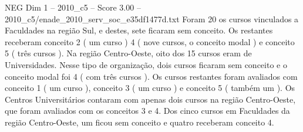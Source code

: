 \begin{textsample}{NEG Dim 1 – 2010\_c5 – Score 3.00 – 2010\_c5/enade\_2010\_serv\_soc\_e35df1477d.txt}
Foram 20 os cursos vinculados a Faculdades na região Sul, e destes, sete ficaram sem conceito.
Os restantes receberam conceito 2 ( um curso ) 4 ( nove cursos, o conceito modal ) e conceito 5 ( três cursos ).
Na região Centro-Oeste, oito dos 15 cursos eram de Universidades.
Nesse tipo de organização, dois cursos ficaram sem conceito e o conceito modal foi 4 ( com três cursos ).
Os cursos restantes foram avaliados com conceito 1 ( um curso ), conceito 3 ( um curso ) e conceito 5 ( também um ).
Os Centros Universitários contaram com apenas dois cursos na região Centro-Oeste, que foram avaliados com os conceitos 3 e 4.
Dos cinco cursos em Faculdades da região Centro-Oeste, um ficou sem conceito e quatro receberam conceito 4.

\end{textsample}

